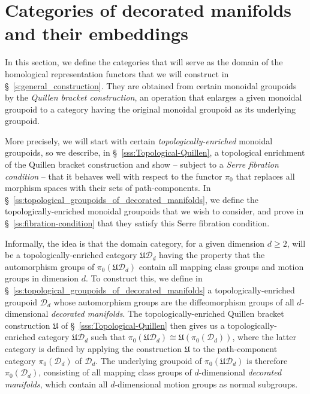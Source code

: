 \documentclass[AHL,Unicode,published]{cedram}
\newcommand{\fU}{\ensuremath{\mathfrak{U}}}
\newcommand{\cD}{\mathcal{D}}
\renewcommand{\geq}{\geqslant}
\begin{document}
\tableofcontents


\section{Categories of decorated manifolds and their embeddings}\label{s:categorical_framework}

In this section, we define the categories that will serve as the domain of the homological representation functors that we will construct in \S~\ref{s:general_construction}. They are obtained from certain monoidal groupoids by the \emph{Quillen bracket construction}, an operation that enlarges a given monoidal groupoid to a category having the original monoidal groupoid as its underlying groupoid.

More precisely, we will start with certain \emph{topologically-enriched} monoidal groupoids, so we describe, in \S~\ref{sss:Topological-Quillen}, a topological enrichment of the Quillen bracket construction and show -- subject to a \emph{Serre fibration condition} -- that it behaves well with respect to the functor $\pi_{0}$ that replaces all morphism spaces with their sets of path-components. In \S~\ref{ss:topological_groupoids_of_decorated_manifolds}, we define the topologically-enriched monoidal groupoids that we wish to consider, and prove in \S~\ref{ss:fibration-condition} that they satisfy this Serre fibration condition.

Informally, the idea is that the domain category, for a given dimension $d\geq 2$, will be a topologically-enriched category $\fU\cD_{d}$ having the property that the automorphism groups of $\pi_{0}(\fU\cD_{d})$ contain all mapping class groups and motion groups in dimension $d$. To construct this, we define in \S~\ref{ss:topological_groupoids_of_decorated_manifolds} a topologically-enriched groupoid $\cD_{d}$ whose automorphism groups are the diffeomorphism groups of all $d$-dimensional \emph{decorated manifolds}. The topologically-enriched Quillen bracket construction $\fU$ of
\S~\ref{sss:Topological-Quillen} then gives us a topologically-enriched category $\fU\cD_{d}$ such that $\pi_{0}(\fU\cD_{d}) \cong
\fU(\pi_{0}(\cD_{d}))$, where the latter category is defined by applying the construction $\fU$ to the path-component category $\pi_{0}(\cD_{d})$ of $\cD_{d}$. The underlying groupoid of $\pi_{0}(\fU\cD_{d})$ is therefore $\pi_{0}(\cD_{d})$, consisting of all mapping class groups of $d$-dimensional
\emph{decorated manifolds}, which contain all $d$-dimensional motion groups as normal subgroups.
\end{document}
